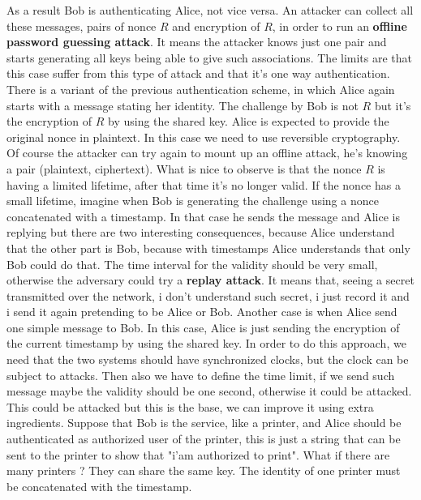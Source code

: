\documentclass[11pt]{article}
\begin{document}
As a result Bob is authenticating Alice, not vice versa. An attacker can collect all these messages, pairs of nonce $R$ and encryption of $R$, in order to run an \textbf{offline password guessing attack}. It means the attacker knows just one pair and starts generating all keys being able to give such associations. The limits are that this case suffer from this type of attack and that it's one way authentication. There is a variant of the previous authentication scheme, in which Alice again starts with a message stating her identity. The challenge by Bob is not $R$ but it's the encryption of $R$ by using the shared key. Alice is expected to provide the original nonce in plaintext. In this case we need to use reversible cryptography. Of course the attacker can try again to mount up an offline attack, he's knowing a pair (plaintext, ciphertext). What is nice to observe is that the nonce $R$ is having a limited lifetime, after that time it's no longer valid. If the nonce has a small lifetime, imagine when Bob is generating the challenge using a nonce concatenated with a timestamp. In that case he sends the message and Alice is replying but there are two interesting consequences, because Alice understand that the other part is Bob, because with timestamps Alice understands that only Bob could do that. The time interval for the validity should be very small, otherwise the adversary could try a \textbf{replay attack}. It means that, seeing a secret transmitted over the network, i don't understand such secret, i just record it and i send it again pretending to be Alice or Bob. Another case is when Alice send one simple message to Bob. In this case, Alice is just sending the encryption of the current timestamp by using the shared key. In order to do this approach, we need that the two systems should have synchronized clocks, but the clock can be subject to attacks. Then also we have to define the time limit, if we send such message maybe the validity should be one second, otherwise it could be attacked. This could be attacked but this is the base, we can improve it using extra ingredients. Suppose that Bob is the service, like a printer, and Alice should be authenticated as authorized user of the printer, this is just a string that can be sent to the printer to show that "i'am authorized to print". What if there are many printers ? They can share the same key. The identity of one printer must be concatenated with the timestamp.
\end{document}
